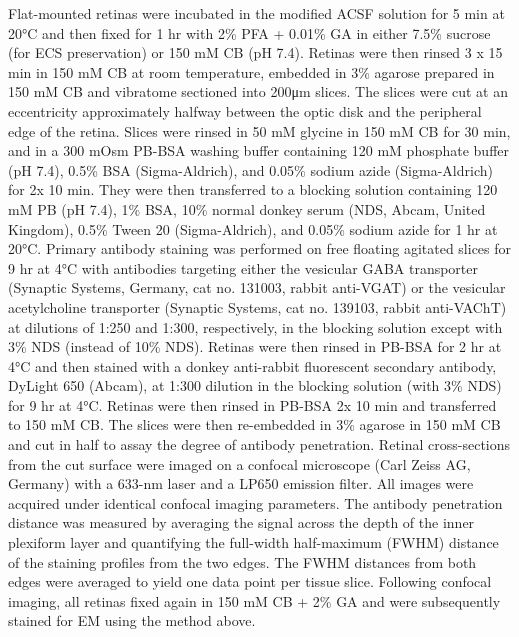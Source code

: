\documentclass{article}
\begin{document}
Flat-mounted retinas were incubated in the modified ACSF solution for 5 min at 20°C and then fixed for 1 hr with 2\% PFA + 0.01\% GA in either 7.5\% sucrose (for ECS preservation) or 150 mM CB (pH 7.4). Retinas were then rinsed 3 x 15 min in 150 mM CB at room temperature, embedded in 3\% agarose prepared in 150 mM CB and vibratome sectioned into 200μm slices. The slices were cut at an eccentricity approximately halfway between the optic disk and the peripheral edge of the retina. Slices were rinsed in 50 mM glycine in 150 mM CB for 30 min, and in a 300 mOsm PB-BSA washing buffer containing 120 mM phosphate buffer (pH 7.4), 0.5\% BSA (Sigma-Aldrich), and 0.05\% sodium azide (Sigma-Aldrich) for 2x 10 min. They were then transferred to a blocking solution containing 120 mM PB (pH 7.4), 1\% BSA, 10\% normal donkey serum (NDS, Abcam, United Kingdom), 0.5\% Tween 20 (Sigma-Aldrich), and 0.05\% sodium azide for 1 hr at 20°C. Primary antibody staining was performed on free floating agitated slices for 9 hr at 4°C with antibodies targeting either the vesicular GABA transporter (Synaptic Systems, Germany, cat no. 131003, rabbit anti-VGAT) or the vesicular acetylcholine transporter (Synaptic Systems, cat no. 139103, rabbit anti-VAChT) at dilutions of 1:250 and 1:300, respectively, in the blocking solution except with 3\% NDS (instead of 10\% NDS). Retinas were then rinsed in PB-BSA for 2 hr at 4°C and then stained with a donkey anti-rabbit fluorescent secondary antibody, DyLight 650 (Abcam), at 1:300 dilution in the blocking solution (with 3\% NDS) for 9 hr at 4°C. Retinas were then rinsed in PB-BSA 2x 10 min and transferred to 150 mM CB. The slices were then re-embedded in 3\% agarose in 150 mM CB and cut in half to assay the degree of antibody penetration. Retinal cross-sections from the cut surface were imaged on a confocal microscope (Carl Zeiss AG, Germany) with a 633-nm laser and a LP650 emission filter. All images were acquired under identical confocal imaging parameters. The antibody penetration distance was measured by averaging the signal across the depth of the inner plexiform layer and quantifying the full-width half-maximum (FWHM) distance of the staining profiles from the two edges. The FWHM distances from both edges were averaged to yield one data point per tissue slice. Following confocal imaging, all retinas fixed again in 150 mM CB + 2\% GA and were subsequently stained for EM using the method above.
\end{document}
